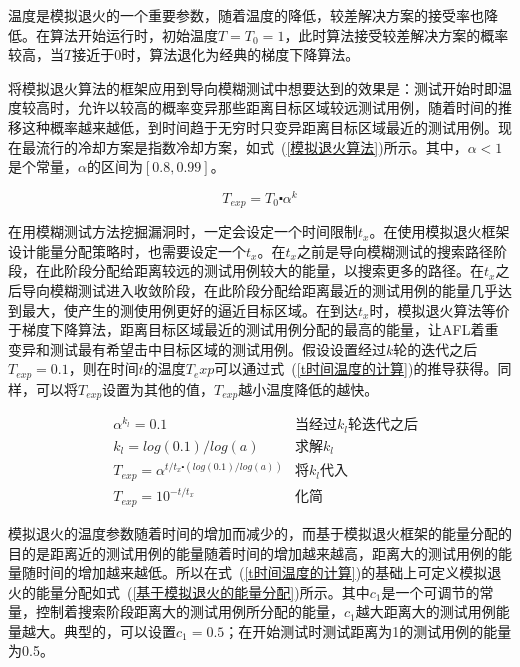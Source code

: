 温度是模拟退火的一个重要参数，随着温度的降低，较差解决方案的接受率也降低。在算法开始运行时，初始温度$T=T_0=1$，此时算法接受较差解决方案的概率较高，当$T$接近于0时，算法退化为经典的梯度下降算法。

将模拟退火算法的框架应用到导向模糊测试中想要达到的效果是：测试开始时即温度较高时，允许以较高的概率变异那些距离目标区域较远测试用例，随着时间的推移这种概率越来越低，到时间趋于无穷时只变异距离目标区域最近的测试用例。现在最流行的冷却方案是指数冷却方案，如式~(\ref{模拟退火算法})所示。其中，$\alpha<1$是个常量，$\alpha$的区间为$[0.8,0.99]$。

\begin{equation}\label{模拟退火算法}
T_{exp} = T_0 \centerdot \alpha^{k}
\end{equation}

在用模糊测试方法挖掘漏洞时，一定会设定一个时间限制$t_x$。在使用模拟退火框架设计能量分配策略时，也需要设定一个$t_x$。在$t_x$之前是导向模糊测试的搜索路径阶段，在此阶段分配给距离较远的测试用例较大的能量，以搜索更多的路径。在$t_x$之后导向模糊测试进入收敛阶段，在此阶段分配给距离最近的测试用例的能量几乎达到最大，使产生的测使用例更好的逼近目标区域。在到达$t_x$时，模拟退火算法等价于梯度下降算法，距离目标区域最近的测试用例分配的最高的能量，让AFL着重变异和测试最有希望击中目标区域的测试用例。假设设置经过$k$轮的迭代之后$T_{exp}=0.1$，则在时间$t$的温度$T_exp$可以通过式~(\ref{t时间温度的计算})的推导获得。同样，可以将$T_{exp}$设置为其他的值，$T_{exp}$越小温度降低的越快。

\begin{equation}\label{t时间温度的计算}
\begin{aligned}
& \alpha^{k_{l}} = 0.1 & \text{当经过}k_{l}\text{轮迭代之后}\\
& k_{l} = log(0.1)/log(a) &\text{求解}k_{l}\\
& T_{exp} = \alpha^{t/t_{x} \centerdot (log(0.1)/log(a))} & \text{将}k_{l}\text{代入}\\
& T_{exp} = 10^{-t/t_{x}} &\text{化简}
\end{aligned}
\end{equation}

模拟退火的温度参数随着时间的增加而减少的，而基于模拟退火框架的能量分配的目的是距离近的测试用例的能量随着时间的增加越来越高，距离大的测试用例的能量随时间的增加越来越低。所以在式~(\ref{t时间温度的计算})的基础上可定义模拟退火的能量分配如式~(\ref{基于模拟退火的能量分配})所示。其中$c_{1}$是一个可调节的常量，控制着搜索阶段距离大的测试用例所分配的能量，$c_{1}$越大距离大的测试用例能量越大。典型的，可以设置$c_{1} = 0.5$；在开始测试时测试距离为1的测试用例的能量为0.5。

